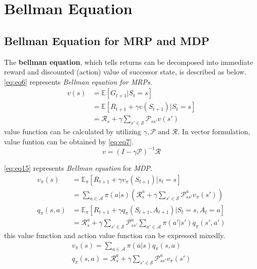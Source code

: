 \documentclass[
	10pt, %
]{article}
\theoremstyle{plain}
\newcommand{\mbb}[1]{\mathbb{#1}}
\newcommand{\mc}[1]{\mathcal{#1}}
\newcommand{\tb}[1]{\textbf{#1}}
\newcommand{\ti}[1]{\textit{#1}}
\numberwithin{equation}{subsection} %
\begin{document}
\section{Bellman Equation}
\subsection{Bellman Equation for MRP and MDP}
The \tb{bellman equation}, which tells returns can be decomposed into immediate reward and discounted (action) value of successor state, is described as below.
\cref{eq:eq6} represents \ti{Bellman equation for MRPs}.
\begin{equation} \label{eq:eq6}
    \begin{aligned}
        v(s) &= \mbb{E}[G_{t+1}|S_t = s] \\
        &= \mbb{E}[R_{t+1} + \gamma v(S_{t+1})|S_t = s] \\
        &= \mc{R}_s + \gamma \sum_{s' \in \mc{S}} \mc{P}_{ss'}v(s')
    \end{aligned}
\end{equation}
value function can be calculated by utilizing $\gamma, \mc{P} \text{ and } \mc{R}$. 
In vector formulation, value funtion can be obtained by \cref{eq:eq7}.
\begin{equation} \label{eq:eq7}
    v = (I - \gamma \mc{P})^{-1}\mc{R}
\end{equation}

\cref{eq:eq15} represents \ti{Bellman equation} for \ti{MDP}.
\begin{equation} \label{eq:eq15}
    \begin{aligned} 
        v_\pi(s)&=\mbb{E}_\pi[R_{t+1}+\gamma v_\pi(S_{t+1})|s_t=s]\\
        &=\sum_{a \in \mc{A}}\pi(a|s)\left(\mc{R}^a_{s}+\gamma\sum_{s' \in \mc{S}}\mc{P}^a_{ss'}v_\pi(s')\right)\\
        q_\pi(s,a)&=\mbb{E}_\pi[R_{t+1}+\gamma q_\pi(S_{t+1},A_{t+1})|S_t=s,A_t=a]\\
        &=\mc{R}^a_s+\gamma \sum_{s' \in \mc{S}}\mc{P}_{ss'}^a \sum_{a' \in \mc{A}} \pi(a'|s')q_\pi(s',a')
    \end{aligned}
\end{equation}
this value function and action value function can be expressed mixedly.
\begin{equation} \label{eq:eq16}
    \begin{gathered}
        v_\pi(s) = \sum_{a \in \mc{A}}\pi(a|s)q_\pi(s,a)\\
        q_\pi(s,a) = \mc{R}^a_s + \gamma\sum_{s' \in \mc{S}}\mc{P}^a_{ss'}v_\pi(s')
    \end{gathered}
\end{equation}
\end{document}
